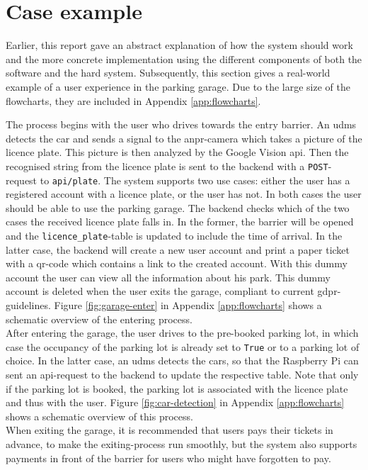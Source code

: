 \section{Case example}\label{sec:case-example}
Earlier, this report gave an abstract explanation of how the system should work and the more concrete implementation using the different components of both the software and the hard system. Subsequently, this section gives a real-world example of a user experience in the parking garage. Due to the large size of the flowcharts, they are included in Appendix \ref{app:flowcharts}.

\ind The process begins with the user who drives towards the entry barrier. An \ac{udms} detects the car and sends a signal to the \ac{anpr}-camera which takes a picture of the licence plate. This picture is then analyzed by the Google Vision \ac{api}. Then the recognised string from the licence plate is sent to the backend with a \texttt{POST}-request to \texttt{api/plate}. The system supports two use cases: either the user has a registered account with a licence plate, or the user has not. In both cases the user should be able to use the parking garage. The backend checks which of the two cases the received licence plate falls in. In the former, the barrier will be opened and the \verb|licence_plate|-table is updated to include the time of arrival. In the latter case, the backend will create a new user account and print a paper ticket with a \ac{qr}-code which contains a link to the created account. With this dummy account the user can view all the information about his park. This dummy account is deleted when the user exits the garage, compliant to current \ac{gdpr}-guidelines. Figure \ref{fig:garage-enter} in Appendix \ref{app:flowcharts} shows a schematic overview of the entering process. \\

After entering the garage, the user drives to the pre-booked parking lot, in which case the occupancy of the parking lot is already set to \texttt{True} or to a parking lot of choice. In the latter case, an \ac{udms} detects the cars, so that the Raspberry Pi can sent an \ac{api}-request to the backend to update the respective table. Note that only if the parking lot is booked, the parking lot is associated with the licence plate and thus with the user. Figure \ref{fig:car-detection} in Appendix \ref{app:flowcharts} shows a schematic overview of this process. \\

When exiting the garage, it is recommended that users pays their tickets in advance, to make the exiting-process run smoothly, but the system also supports payments in front of the barrier for users who might have forgotten to pay.

